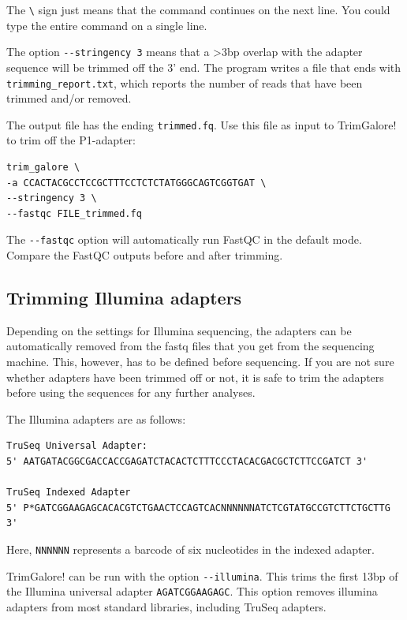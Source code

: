 \documentclass[11pt]{article}
\begin{document}
The \texttt{\textbackslash{}} sign just means that the command continues on the next
line. You could type the entire command on a single line.


The option \texttt{-{}-stringency 3} means that a >3bp overlap with the adapter
sequence will be trimmed off the 3' end. The program writes a file
that ends with \texttt{trimming\_report.txt}, which reports the number of
reads that have been trimmed and/or removed.

The output file has the ending \texttt{trimmed.fq}. Use this file as
input to TrimGalore! to trim off the P1-adapter:

\begin{verbatim}
trim_galore \
-a CCACTACGCCTCCGCTTTCCTCTCTATGGGCAGTCGGTGAT \
--stringency 3 \
--fastqc FILE_trimmed.fq
\end{verbatim}

The \texttt{-{}-fastqc} option will automatically run FastQC in the default
mode. Compare the FastQC outputs before and after trimming.


\clearpage

\subsection{Trimming Illumina adapters}
\label{sec:orgheadline4}
Depending on the settings for Illumina sequencing, the adapters can be
automatically removed from the fastq files that you get from the
sequencing machine. This, however, has to be defined before
sequencing. If you are not sure whether adapters have been trimmed off
or not, it is safe to trim the adapters before using the sequences for
any further analyses.

The Illumina adapters are as follows:

\begin{verbatim}
TruSeq Universal Adapter:
5' AATGATACGGCGACCACCGAGATCTACACTCTTTCCCTACACGACGCTCTTCCGATCT 3'

TruSeq Indexed Adapter
5' P*GATCGGAAGAGCACACGTCTGAACTCCAGTCACNNNNNNATCTCGTATGCCGTCTTCTGCTTG 3'
\end{verbatim}

Here, \texttt{NNNNNN} represents a barcode of six nucleotides in the indexed adapter.

TrimGalore! can be run with the option \texttt{-{}-illumina}. This trims the
first 13bp of the Illumina universal adapter \texttt{AGATCGGAAGAGC}. This
option removes illumina adapters from most standard libraries,
including TruSeq adapters.
\end{document}
